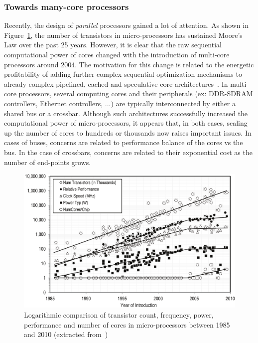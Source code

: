 \documentclass[main.tex]{subfiles}
\begin{document}
\subsubsection{Towards many-core processors}
Recently, the design of \emph{parallel} processors gained a lot of attention. As shown in Figure~\ref{fig_intro_procPerfScaling}, the number of transistors in micro-processors has sustained Moore's Law over the past 25 years. However, it is clear that the raw sequential computational power of cores changed with the introduction of multi-core processors around 2004. The motivation for this change is related to the energetic profitability of adding further complex sequential optimization mechanisms to already complex pipelined, cached and speculative core architectures~\cite{Borkar2011}. In multi-core processors, several computing cores and their peripherals (ex: DDR-SDRAM controllers, Ethernet controllers, ...) are typically interconnected by either a shared bus or a crossbar. Although such architectures successfully increased the computational power of micro-processors, it appears that, in both cases, scaling up the number of cores to hundreds or thousands now raises important issues. In cases of buses, concerns are related to performance balance of the cores vs the bus. In the case of crossbars, concerns are related to their exponential cost as the number of end-points grows.

\begin{figure}
    \centering
    \includegraphics[width=14cm]{imgs/png/intro_procPerfScaling.png}
    \caption{Logarithmic comparison of transistor count, frequency, power, performance and number of cores in micro-processors between 1985 and 2010 (extracted from~\cite{Fuller2011})}
    \label{fig_intro_procPerfScaling}
\end{figure}
\end{document}
